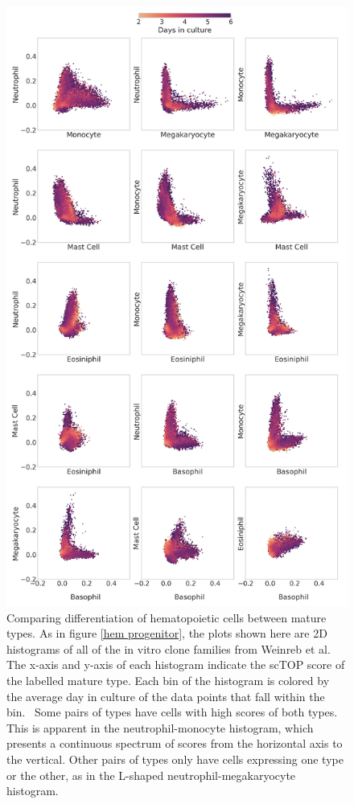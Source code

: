 \documentclass[aps,superscriptaddress, notitlepage,longbibliography]{revtex4-1}
\begin{document}
\begin{figure}
	\centering
		\includegraphics[scale=0.59]{figs/hem mature hists.png}
	\caption{Comparing differentiation of hematopoietic cells between mature types. As in figure \ref{hem progenitor}, the plots shown here are 2D histograms of all of the in vitro clone families from Weinreb et al. The x-axis and y-axis of each histogram indicate the scTOP score of the labelled mature type. Each bin of the histogram is colored by the average day in culture of the data points that fall within the bin.  Some pairs of types have cells with high scores of both types. This is apparent in the neutrophil-monocyte histogram, which presents a continuous spectrum of scores from the horizontal axis to the vertical. Other pairs of types only have cells expressing one type or the other, as in the L-shaped neutrophil-megakaryocyte histogram.}
	\label{hem mature}
\end{figure}
\end{document}
